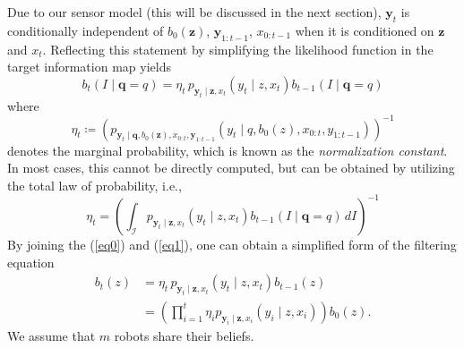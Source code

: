 \documentclass[journal]{IEEEtran}
\begin{document}
Due to our sensor model (this will be discussed in the next section), $\bm{y}_{t}$ is conditionally independent of $b_0(\bm{z})$, $\bm{y}_{1:t-1}$, $x_{0:t-1}$ when it is  conditioned on $\bm{z}$ and $x_t$. Reflecting this statement by simplifying the likelihood function in the target information map yields
\begin{equation}
b_{t}(I \mid \bm{q} = q)=
\eta_t\,
	p_{\bm{y}_{t} \mid
		\bm{z},{x}_{t}}\left(
	y_{t} \mid
	z,{x}_{t}\right)
	b_{t-1}(I \mid \bm{q} = q)
	\label{eq1}
\end{equation}
where
\begin{equation}
\eta_{t} \coloneqq
\left(
	p_{\bm{y}_{t} \mid
	\bm{q},
	b_0(\bm{z}),
	{x}_{0:t},\bm{y}_{1:t-1}	
}\left(
y_{t} \mid
q,b_0(z),
{x}_{0:t},y_{1:t-1}
\right)
\right)^{-1}
\nonumber
\end{equation}
denotes the marginal probability, which is known as the \emph{normalization constant}. In most cases, this cannot be directly computed, but can be obtained by utilizing the total law of probability, i.e.,
\[
\eta_{t} =
\left(\int_{\mathcal{I}}
p_{\bm{y}_{t} \mid
	\bm{z},{x}_{t}}\left(
y_{t} \mid
z,{x}_{t}\right)
b_{t-1}(I \mid \bm{q} = q)
\,dI\right)^{-1}
\]
By joining the (\ref{eq0}) and (\ref{eq1}), one can obtain a simplified form of the filtering equation
\begin{align*}
b_t(z) &=
\eta_t\,
p_{\bm{y}_{t} \mid
	\bm{z},{x}_{t}}\left(
y_{t} \mid
z,{x}_{t}\right)
b_{t-1}(z)\\
&=\left(\prod_{i=1}^t
\eta_i
p_{\bm{y}_{i} \mid
	\bm{z},{x}_{i}}\left(
y_{i} \mid
z,{x}_{i}\right) \right)
b_0(z).
\end{align*}
We assume that $m$ robots share their beliefs. 
\end{document}
